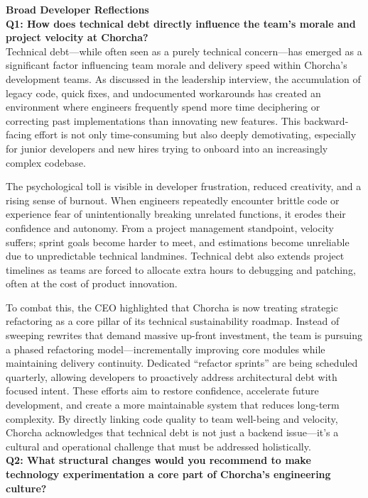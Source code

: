 \documentclass[12pt,a4paper,oneside]{book}
\begin{document}
\textbf{Broad Developer Reflections}\\


\textbf{Q1: How does technical debt directly influence the team’s morale and project velocity at Chorcha?} \\

Technical debt—while often seen as a purely technical concern—has emerged as a significant factor influencing team morale and delivery speed within Chorcha’s development teams. As discussed in the leadership interview, the accumulation of legacy code, quick fixes, and undocumented workarounds has created an environment where engineers frequently spend more time deciphering or correcting past implementations than innovating new features. This backward-facing effort is not only time-consuming but also deeply demotivating, especially for junior developers and new hires trying to onboard into an increasingly complex codebase.

The psychological toll is visible in developer frustration, reduced creativity, and a rising sense of burnout. When engineers repeatedly encounter brittle code or experience fear of unintentionally breaking unrelated functions, it erodes their confidence and autonomy. From a project management standpoint, velocity suffers; sprint goals become harder to meet, and estimations become unreliable due to unpredictable technical landmines. Technical debt also extends project timelines as teams are forced to allocate extra hours to debugging and patching, often at the cost of product innovation.

To combat this, the CEO highlighted that Chorcha is now treating strategic refactoring as a core pillar of its technical sustainability roadmap. Instead of sweeping rewrites that demand massive up-front investment, the team is pursuing a phased refactoring model—incrementally improving core modules while maintaining delivery continuity. Dedicated “refactor sprints” are being scheduled quarterly, allowing developers to proactively address architectural debt with focused intent. These efforts aim to restore confidence, accelerate future development, and create a more maintainable system that reduces long-term complexity. By directly linking code quality to team well-being and velocity, Chorcha acknowledges that technical debt is not just a backend issue—it’s a cultural and operational challenge that must be addressed holistically.\\

\textbf{Q2: What structural changes would you recommend to make technology experimentation a core part of Chorcha's engineering culture?} \\
\end{document}
